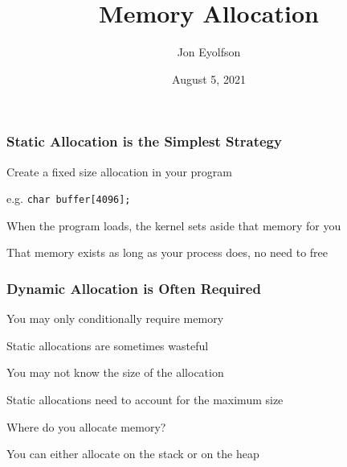

\title{Memory Allocation}
\author{Jon Eyolfson}
\date{August 5, 2021}


  \begin{frame}
    \titlepage
  \end{frame}

  \begin{frame}
    \frametitle{Static Allocation is the Simplest Strategy}

    Create a fixed size allocation in your program

    \hspace{2em} e.g. \lstinline|char buffer[4096];|

    \vspace{2em}

    When the program loads, the kernel sets aside that memory
    for you

    \vspace{2em}

    That memory exists as long as your process does, no need to free
  \end{frame}

  \begin{frame}
    \frametitle{Dynamic Allocation is Often Required}

    You may only conditionally require memory

    \hspace{2em} Static allocations are sometimes wasteful

    \vspace{2em}

    You may not know the size of the allocation

    \hspace{2em} Static allocations need to account for the maximum size

    \vspace{2em}

    Where do you allocate memory?

    \hspace{2em} You can either allocate on the stack or on the heap
  \end{frame}

